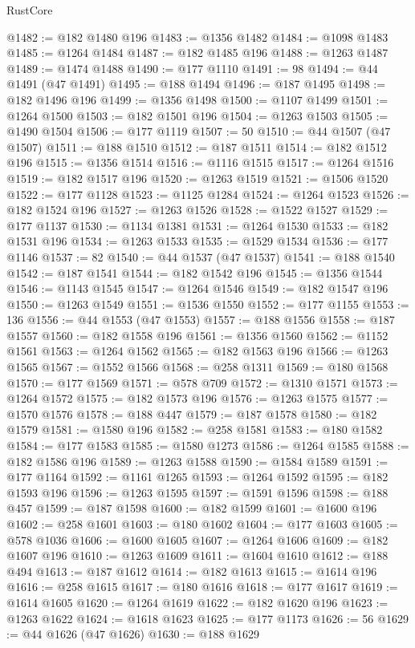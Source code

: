\begin{lexlean}{RustCore}
\begin{coremodule}
@1482 := @182 @1480 @196
@1483 := @1356 @1482
@1484 := @1098 @1483
@1485 := @1264 @1484
@1487 := @182 @1485 @196
@1488 := @1263 @1487
@1489 := @1474 @1488
@1490 := @177 @1110
@1491 := 98
@1494 := @44 @1491 (@47 @1491)
@1495 := @188 @1494
@1496 := @187 @1495
@1498 := @182 @1496 @196
@1499 := @1356 @1498
@1500 := @1107 @1499
@1501 := @1264 @1500
@1503 := @182 @1501 @196
@1504 := @1263 @1503
@1505 := @1490 @1504
@1506 := @177 @1119
@1507 := 50
@1510 := @44 @1507 (@47 @1507)
@1511 := @188 @1510
@1512 := @187 @1511
@1514 := @182 @1512 @196
@1515 := @1356 @1514
@1516 := @1116 @1515
@1517 := @1264 @1516
@1519 := @182 @1517 @196
@1520 := @1263 @1519
@1521 := @1506 @1520
@1522 := @177 @1128
@1523 := @1125 @1284
@1524 := @1264 @1523
@1526 := @182 @1524 @196
@1527 := @1263 @1526
@1528 := @1522 @1527
@1529 := @177 @1137
@1530 := @1134 @1381
@1531 := @1264 @1530
@1533 := @182 @1531 @196
@1534 := @1263 @1533
@1535 := @1529 @1534
@1536 := @177 @1146
@1537 := 82
@1540 := @44 @1537 (@47 @1537)
@1541 := @188 @1540
@1542 := @187 @1541
@1544 := @182 @1542 @196
@1545 := @1356 @1544
@1546 := @1143 @1545
@1547 := @1264 @1546
@1549 := @182 @1547 @196
@1550 := @1263 @1549
@1551 := @1536 @1550
@1552 := @177 @1155
@1553 := 136
@1556 := @44 @1553 (@47 @1553)
@1557 := @188 @1556
@1558 := @187 @1557
@1560 := @182 @1558 @196
@1561 := @1356 @1560
@1562 := @1152 @1561
@1563 := @1264 @1562
@1565 := @182 @1563 @196
@1566 := @1263 @1565
@1567 := @1552 @1566
@1568 := @258 @1311
@1569 := @180 @1568
@1570 := @177 @1569
@1571 := @578 @709
@1572 := @1310 @1571
@1573 := @1264 @1572
@1575 := @182 @1573 @196
@1576 := @1263 @1575
@1577 := @1570 @1576
@1578 := @188 @447
@1579 := @187 @1578
@1580 := @182 @1579
@1581 := @1580 @196
@1582 := @258 @1581
@1583 := @180 @1582
@1584 := @177 @1583
@1585 := @1580 @1273
@1586 := @1264 @1585
@1588 := @182 @1586 @196
@1589 := @1263 @1588
@1590 := @1584 @1589
@1591 := @177 @1164
@1592 := @1161 @1265
@1593 := @1264 @1592
@1595 := @182 @1593 @196
@1596 := @1263 @1595
@1597 := @1591 @1596
@1598 := @188 @457
@1599 := @187 @1598
@1600 := @182 @1599
@1601 := @1600 @196
@1602 := @258 @1601
@1603 := @180 @1602
@1604 := @177 @1603
@1605 := @578 @1036
@1606 := @1600 @1605
@1607 := @1264 @1606
@1609 := @182 @1607 @196
@1610 := @1263 @1609
@1611 := @1604 @1610
@1612 := @188 @494
@1613 := @187 @1612
@1614 := @182 @1613
@1615 := @1614 @196
@1616 := @258 @1615
@1617 := @180 @1616
@1618 := @177 @1617
@1619 := @1614 @1605
@1620 := @1264 @1619
@1622 := @182 @1620 @196
@1623 := @1263 @1622
@1624 := @1618 @1623
@1625 := @177 @1173
@1626 := 56
@1629 := @44 @1626 (@47 @1626)
@1630 := @188 @1629

\end{coremodule}
\end{lexlean}

